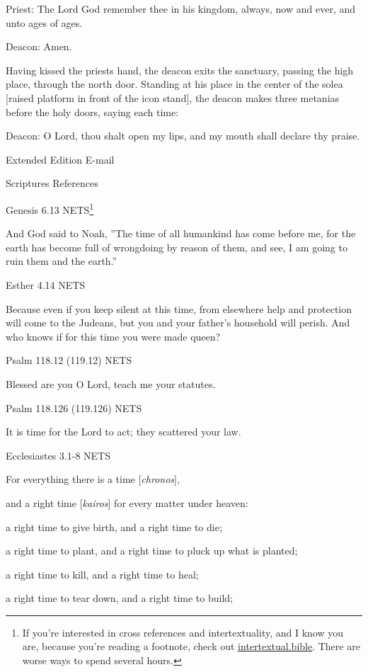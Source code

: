 \documentclass[
]{article}
\newcommand{\RL}[1]{\beginR #1\endR}
\begin{document}
Priest: The Lord God remember thee in his kingdom, always, now and ever,
and unto ages of ages.

Deacon: Amen.

Having kissed the priest\textquotesingle s hand, the deacon exits the
sanctuary, passing the high place, through the north door. Standing at
his place in the center of the solea {[}raised platform in front of the
icon stand{]}, the deacon makes three metanias before the holy doors,
saying each time:

Deacon: O Lord, thou shalt open my lips, and my mouth shall declare thy
praise.

Extended Edition E-mail

Scriptures References

Genesis 6.13 NETS\footnote{If you're interested in cross references and
  intertextuality, and I know you are, because you're reading a
  footnote, check out
  \href{http://intertextual.bible}{\ul{intertextual.bible}}. There are
  worse ways to spend several hours.}

And God said to Noah, \RL{''}The time of all humankind has come before
me, for the earth has become full of wrongdoing by reason of them, and
see, I am going to ruin them and the earth.''

Esther 4.14 NETS

Because even if you keep silent at this time, from elsewhere help and
protection will come to the Judeans, but you and your father\RL{'}s
household will perish. And who knows if for this time you were made
queen?

Psalm 118.12 (119.12) NETS

Blessed are you O Lord, teach me your statutes.

Psalm 118.126 (119.126) NETS

It is time for the Lord to act; they scattered your law.

Ecclesiastes 3.1-8 NETS

For everything there is a time {[}\emph{chronos}{]},

and a right time {[}\emph{kairos}{]} for every matter under heaven:

a right time to give birth, and a right time to die;

a right time to plant, and a right time to pluck up what is planted;

a right time to kill, and a right time to heal;

a right time to tear down, and a right time to build;
\end{document}
